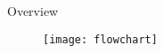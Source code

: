\begin{frame}{Overview}
\begin{figure}[H]
	\begin{center}
	\texttt{[image: flowchart]}
	\end{center}
	\end{figure}
\end{frame}